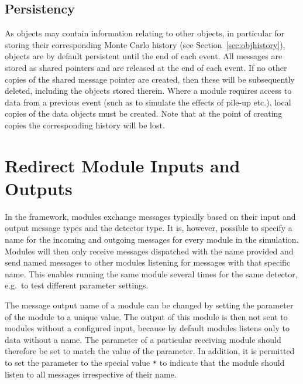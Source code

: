 \subsection{Persistency}
\label{ch:objects_persistency}
As objects may contain information relating to other objects, in particular for storing their corresponding Monte Carlo history (see Section~\ref{sec:objhistory}), objects are by default persistent until the end of each event. All messages are stored as shared pointers and are released at the end of each event. If no other copies of the shared message pointer are created, then these will be subsequently deleted, including the objects stored therein. Where a module requires access to data from a previous event (such as to simulate the effects of pile-up etc.), local copies of the data objects must be created. Note that at the point of creating copies the corresponding history will be lost.


\section{Redirect Module Inputs and Outputs}
\label{sec:redirect_module_input_outputs}
In the \apsq framework, modules exchange messages typically based on their input and output message types and the detector type.
It is, however, possible to specify a name for the incoming and outgoing messages for every module in the simulation.
Modules will then only receive messages dispatched with the name provided and send named messages to other modules listening for messages with that specific name.
This enables running the same module several times for the same detector, e.g.\ to test different parameter settings.

The message output name of a module can be changed by setting the  parameter of the module to a unique value.
The output of this module is then not sent to modules without a configured input, because by default modules listens only to data without a name.
The  parameter of a particular receiving module should therefore be set to match the value of the  parameter.
In addition, it is permitted to set the  parameter to the special value \texttt{*} to indicate that the module should listen to all messages irrespective of their name.

